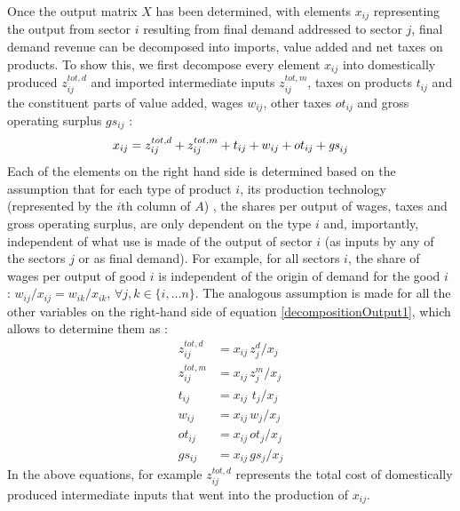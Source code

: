 \documentclass[12pt,english]{article}
\newcommand{\mli}[1]{\mathit{#1}}
\begin{document}
Once the output matrix $X$ has been determined, with elements $x_{ij}$ representing the output from sector $i$ resulting from final demand addressed to sector $j$, %
final demand revenue can be decomposed into imports, value added and net taxes on products. To show this, we first decompose every element $x_{ij}$ into domestically produced $z^{tot,d}_{ij}$ and imported intermediate inputs $z^{tot,m}_{ij}$, taxes on products $t_{ij}$ and the constituent parts of value added, wages $w_{ij}$, other taxes $ot_{ij}$ and gross operating surplus $gs_{ij}$ :   
\begin{equation}
x_{ij} = z^{tot,d}_{ij} + z^{tot,m}_{ij} + t_{ij} + w_{ij} + ot_{ij} + \mli{gs}_{ij} \label{decompositionOutput1} \\
\end{equation}
Each of the elements on the right hand side is determined based on the assumption 
that for each type of product $i$, its production technology (represented by the $i$th column of $A$)%
, the shares per output of wages, taxes and gross operating surplus, are only dependent on the type $i$ and, importantly, independent of what use is made of the output of sector $i$ (as inputs by any of the sectors $j$ or as final demand). For example, for all sectors $i$, the share of wages per output of good $i$ is independent of the origin of demand for the good $i$ : $w_{ij}/x_{ij} = w_{ik}/x_{ik}$, $\forall j,k \in \{i, \dots n\}$. The analogous assumption is made for all the other variables on the right-hand side of equation \ref{decompositionOutput1}, %
which allows to determine them as : 
\begin{align}
z^{tot,d}_{ij} &= x_{ij} \, z^d_j/x_j \\
z^{tot,m}_{ij} &= x_{ij} \, z^m_j/x_j \label{totImports} \\
t_{ij} &= x_{ij} \, \, t_j/x_j \\
w_{ij} &= x_{ij} \, w_j/x_j \\
ot_{ij} &= x_{ij} \, ot_j/x_j \\
gs_{ij} &= x_{ij} \, gs_j/x_j
\end{align}
In the above equations, for example $z^{tot,d}_{ij}$ represents the total cost of domestically produced intermediate inputs that went into the production of $x_{ij}$. %
\end{document}

